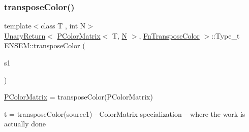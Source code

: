 \subsubsection{\texorpdfstring{transposeColor()}{transposeColor()}}
{\footnotesize\ttfamily template$<$class T , int N$>$ \\
\mbox{\hyperlink{structENSEM_1_1UnaryReturn}{Unary\+Return}}$<$ \mbox{\hyperlink{classENSEM_1_1PColorMatrix}{P\+Color\+Matrix}}$<$ T, \mbox{\hyperlink{operator__name__util_8cc_a7722c8ecbb62d99aee7ce68b1752f337}{N}} $>$, \mbox{\hyperlink{structENSEM_1_1FnTransposeColor}{Fn\+Transpose\+Color}} $>$\+::Type\+\_\+t E\+N\+S\+E\+M\+::transpose\+Color (\begin{DoxyParamCaption}\item[{const \mbox{\hyperlink{classENSEM_1_1PColorMatrix}{P\+Color\+Matrix}}$<$ T, \mbox{\hyperlink{operator__name__util_8cc_a7722c8ecbb62d99aee7ce68b1752f337}{N}} $>$ \&}]{s1 }\end{DoxyParamCaption})\hspace{0.3cm}{\ttfamily [inline]}}



\mbox{\hyperlink{classENSEM_1_1PColorMatrix}{P\+Color\+Matrix}} = transpose\+Color(\+P\+Color\+Matrix) 

t = transpose\+Color(source1) -\/ Color\+Matrix specialization -- where the work is actually done 